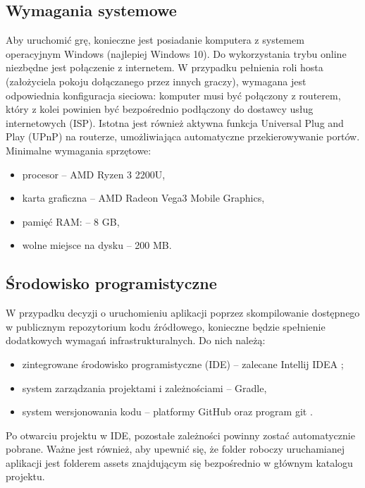 \subsection{Wymagania systemowe}
Aby uruchomić grę, konieczne jest posiadanie komputera z systemem operacyjnym Windows (najlepiej Windows 10). Do wykorzystania trybu online niezbędne jest połączenie z internetem. W przypadku pełnienia roli hosta (założyciela pokoju dołączanego przez innych graczy), wymagana jest odpowiednia konfiguracja sieciowa: komputer musi być połączony z routerem, który z kolei powinien być bezpośrednio podłączony do dostawcy usług internetowych (ISP). Istotna jest również aktywna funkcja Universal Plug and Play (UPnP) na routerze, umożliwiająca automatyczne przekierowywanie portów. Minimalne wymagania sprzętowe:
\begin{itemize}
\item procesor -- AMD Ryzen 3 2200U,
\item karta graficzna -- AMD Radeon Vega3 Mobile Graphics,
\item pamięć RAM: -- 8 GB,
\item wolne miejsce na dysku -- 200 MB.
\end{itemize}

\subsection{Środowisko programistyczne}
W przypadku decyzji o uruchomieniu aplikacji poprzez skompilowanie dostępnego w publicznym repozytorium kodu źródłowego, konieczne będzie spełnienie dodatkowych wymagań infrastrukturalnych. Do nich należą:
\begin{itemize}
\item zintegrowane środowisko programistyczne (IDE) -- zalecane Intellij IDEA \cite{IntellijIDEA}; 
\item system zarządzania projektami i zależnościami -- Gradle,
\item system wersjonowania kodu -- platformy GitHub \cite{GitHub} oraz program git \cite{Git}.
\end{itemize}
Po otwarciu projektu w IDE, pozostałe zależności powinny zostać automatycznie pobrane. Ważne jest również, aby upewnić się, że folder roboczy uruchamianej aplikacji jest folderem assets znajdującym się bezpośrednio w głównym katalogu projektu.

